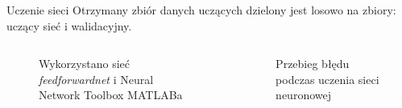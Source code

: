 \documentclass{beamer}
\begin{document}
\begin{frame}{Uczenie sieci}
Otrzymany zbiór danych uczących dzielony jest losowo na zbiory: uczący sieć i walidacyjny.
\begin{columns}
	\begin{figure}
		\centering
		\caption{Wykorzystano sieć \textit{feedforwardnet} i Neural Network Toolbox MATLABa}
	\end{figure}
	
	\begin{figure}
		\centering
		\caption{Przebieg błędu podczas uczenia sieci neuronowej}
	\end{figure}
\end{columns}
\end{frame}
\end{document}
